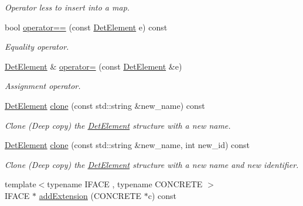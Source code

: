 \begin{DoxyCompactItemize}
\begin{DoxyCompactList}\small\item\em Operator less to insert into a map. \item\end{DoxyCompactList}\item 
bool \hyperlink{class_d_d4hep_1_1_geometry_1_1_det_element_aa1fa06d9532161b9dc14a124d7902edd}{operator==} (const \hyperlink{class_d_d4hep_1_1_geometry_1_1_det_element}{DetElement} e) const 
\begin{DoxyCompactList}\small\item\em Equality operator. \item\end{DoxyCompactList}\item 
\hyperlink{class_d_d4hep_1_1_geometry_1_1_det_element}{DetElement} \& \hyperlink{class_d_d4hep_1_1_geometry_1_1_det_element_a22ca67f5376d3d1c641fa02eada16c33}{operator=} (const \hyperlink{class_d_d4hep_1_1_geometry_1_1_det_element}{DetElement} \&e)
\begin{DoxyCompactList}\small\item\em Assignment operator. \item\end{DoxyCompactList}\item 
\hyperlink{class_d_d4hep_1_1_geometry_1_1_det_element}{DetElement} \hyperlink{class_d_d4hep_1_1_geometry_1_1_det_element_a60dd867e5753b97a8d6df6c96846b11f}{clone} (const std::string \&new\_\-name) const 
\begin{DoxyCompactList}\small\item\em Clone (Deep copy) the \hyperlink{class_d_d4hep_1_1_geometry_1_1_det_element}{DetElement} structure with a new name. \item\end{DoxyCompactList}\item 
\hyperlink{class_d_d4hep_1_1_geometry_1_1_det_element}{DetElement} \hyperlink{class_d_d4hep_1_1_geometry_1_1_det_element_a9e21f6b6f70dd9898d41141a83689c8b}{clone} (const std::string \&new\_\-name, int new\_\-id) const 
\begin{DoxyCompactList}\small\item\em Clone (Deep copy) the \hyperlink{class_d_d4hep_1_1_geometry_1_1_det_element}{DetElement} structure with a new name and new identifier. \item\end{DoxyCompactList}\item 
{\footnotesize template$<$typename IFACE , typename CONCRETE $>$ }\\IFACE $\ast$ \hyperlink{class_d_d4hep_1_1_geometry_1_1_det_element_a0ef6d28c7c6778cf0f42b77a71212699}{addExtension} (CONCRETE $\ast$c) const 

\end{DoxyCompactItemize}

